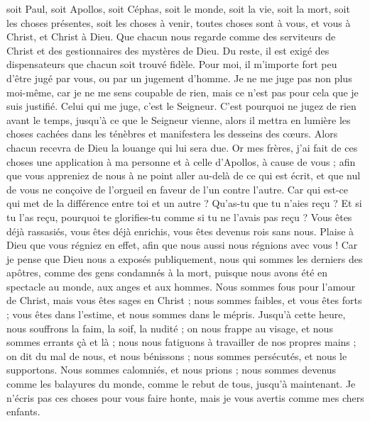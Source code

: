 \begin{multicols}{2}
soit Paul, soit Apollos, soit Céphas, soit le monde, soit la vie, soit la mort, soit les choses présentes, soit les choses à venir, toutes choses sont à vous,
et vous à Christ, et Christ à Dieu.
\VerseOne{}Que chacun nous regarde comme des serviteurs de Christ et des gestionnaires des mystères de Dieu.
Du reste, il est exigé des dispensateurs que chacun soit trouvé fidèle.
Pour moi, il m'importe fort peu d'être jugé par vous, ou par un jugement d'homme. Je ne me juge pas non plus moi-même, car je ne me sens coupable de rien,
mais ce n'est pas pour cela que je suis justifié. Celui qui me juge, c'est le Seigneur.
C'est pourquoi ne jugez de rien avant le temps, jusqu'à ce que le Seigneur vienne, alors il mettra en lumière les choses cachées dans les ténèbres et manifestera les desseins des cœurs. Alors chacun recevra de Dieu la louange qui lui sera due.
Or mes frères, j'ai fait de ces choses une application à ma personne et à celle d'Apollos, à cause de vous ; afin que vous appreniez de nous à ne point aller au-delà de ce qui est écrit, et que nul de vous ne conçoive de l'orgueil en faveur de l'un contre l'autre.
Car qui est-ce qui met de la différence entre toi et un autre ? Qu'as-tu que tu n'aies reçu ? Et si tu l'as reçu, pourquoi te glorifies-tu comme si tu ne l'avais pas reçu ?
Vous êtes déjà rassasiés, vous êtes déjà enrichis, vous êtes devenus rois sans nous. Plaise à Dieu que vous régniez en effet, afin que nous aussi nous régnions avec vous !
Car je pense que Dieu nous a exposés publiquement, nous qui sommes les derniers des apôtres, comme des gens condamnés à la mort, puisque nous avons été en spectacle au monde, aux anges et aux hommes.
Nous sommes fous pour l'amour de Christ, mais vous êtes sages en Christ ; nous sommes faibles, et vous êtes forts ; vous êtes dans l'estime, et nous sommes dans le mépris.
Jusqu'à cette heure, nous souffrons la faim, la soif, la nudité ; on nous frappe au visage, et nous sommes errants çà et là ;
nous nous fatiguons à travailler de nos propres mains ; on dit du mal de nous, et nous bénissons ; nous sommes persécutés, et nous le supportons.
Nous sommes calomniés, et nous prions ; nous sommes devenus comme les balayures du monde, comme le rebut de tous, jusqu'à maintenant.
Je n'écris pas ces choses pour vous faire honte, mais je vous avertis comme mes chers enfants.

\end{multicols}
